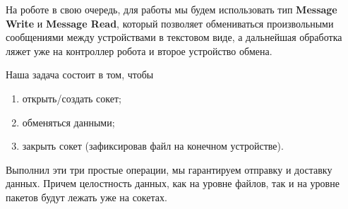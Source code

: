На роботе в свою очередь, для работы мы будем использовать тип \textbf{Message Write} и \textbf{Message Read}, который позволяет обмениваться произвольными сообщениями между устройствами в текстовом виде, а дальнейшая обработка ляжет уже на контроллер робота и второе устройство обмена.

Наша задача состоит в том, чтобы 
\begin{enumerate}
  \item открыть/создать сокет;
  \item обменяться данными;
  \item закрыть сокет (зафиксировав файл на конечном устройстве).
\end{enumerate}

Выполнил эти три простые операции, мы гарантируем отправку и доставку данных. Причем целостность данных, как на уровне файлов, так и на уровне пакетов будут лежать уже на сокетах.













